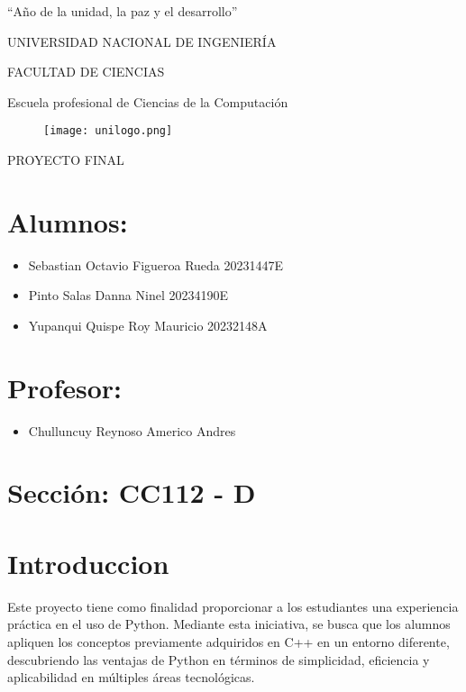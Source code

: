 \documentclass[10pt,a4paper]{article}
\begin{document}
\begin{center}
    “Año de la unidad, la paz y el desarrollo” 
\end{center}
\begin{center}
\LARGE
    UNIVERSIDAD NACIONAL DE INGENIERÍA 
\end{center}
\begin{center}
\LARGE
    FACULTAD DE CIENCIAS 
\end{center}
\begin{center}
\large
    Escuela profesional de Ciencias de la Computaci\'on
\end{center}

\begin{figure}[ht]
    \centering
    \texttt{[image: unilogo.png]}
\end{figure}
\begin{center}
\LARGE
PROYECTO FINAL
\end{center}
\begin{center}
\LARGE
\end{center}
\section*{Alumnos:}
\begin{itemize} 
    \item Sebastian Octavio Figueroa Rueda 20231447E
    \item Pinto Salas Danna Ninel 20234190E
    \item Yupanqui Quispe Roy Mauricio 20232148A
\end{itemize}
\section*{Profesor:}
\begin{itemize}
    \item Chulluncuy Reynoso Americo Andres
\end{itemize}
\section*{Secci\'on: CC112 - D}

\newpage
\tableofcontents
\newpage
\section{Introduccion}

Este proyecto tiene como finalidad proporcionar a los estudiantes una experiencia práctica en el uso de Python. Mediante esta iniciativa, se busca que los alumnos apliquen los conceptos previamente adquiridos en C++ en un entorno diferente, descubriendo las ventajas de Python en términos de simplicidad, eficiencia y aplicabilidad en múltiples áreas tecnológicas.
\end{document}
